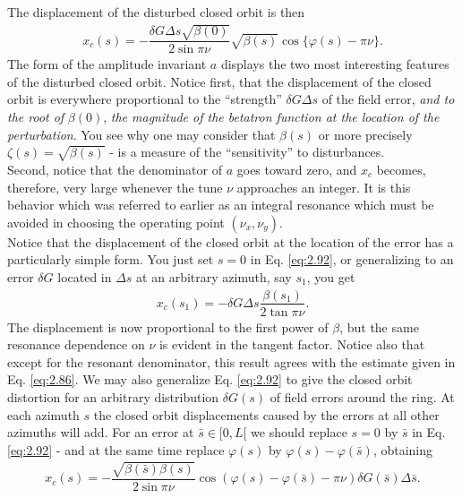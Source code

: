 The displacement of the disturbed closed orbit is then
\begin{align}\label{eq:2.92}
	x_c(s) = -\dfrac{\delta G \Delta s \sqrt{\beta(0)}}{2 \sin\pi\nu}\sqrt{\beta(s)}\cos\{\varphi(s)-\pi\nu\}.
\end{align}
The form of the amplitude invariant $a$ displays the two most interesting features of the disturbed closed orbit. Notice first, that the displacement of the closed orbit is everywhere
 proportional to the ``strength'' $\delta G \Delta s$ of the field error, \emph{and to the root of} $\beta(0)$, \emph{the magnitude of the betatron function at the location of the perturbation}. You see why one may consider that $\beta(s)$ or more precisely $\zeta(s) = \sqrt{\beta(s)}$ - is a measure of the ``sensitivity'' to disturbances.\\
Second, notice that the denominator of $a$ goes toward zero, and $x_c$ becomes, therefore, very large whenever the tune $\nu$ approaches an integer. It is this behavior which was referred
 to earlier as an integral resonance which must be avoided in choosing the operating point $(\nu_x, \nu_y)$.\\
Notice that the displacement of the closed orbit at the location of the error has a particularly
 simple form. You just set $s = 0$ in Eq. \eqref{eq:2.92}, or generalizing to an error $\delta G$ located in $\Delta s$ at an arbitrary azimuth, say $s_1$, you get
 \begin{align}
	x_c(s_1) = -\delta G \Delta s \dfrac{\beta{(s_1)}}{2 \tan\pi\nu}.
\end{align}
The displacement is now proportional to the first power of $\beta$, but the same resonance
dependence on $\nu$ is evident in the tangent factor. Notice also that except for the resonant denominator, this result agrees with the estimate given in Eq. \eqref{eq:2.86}.
We may also generalize Eq. \eqref{eq:2.92} to give the closed orbit distortion for an
arbitrary distribution $\delta G(s)$ of field errors around the ring. At each azimuth $s$ the closed orbit displacements caused by the errors at all other azimuths will add. For an error
 at $\bar{s} \in [0,L[$ we should replace $s = 0$ by $\bar{s}$ in Eq. \eqref{eq:2.92} - and at the same time replace $\varphi(s)$ by $\varphi(s) - \varphi(\bar{s})$, obtaining
\begin{align}\label{eq:dist_closed_orb}
x_c(s) = -\dfrac{\sqrt{\beta(\bar{s})\beta(s)}}{2\sin\pi\nu} \cos(\varphi(s)-\varphi(\bar{s})-\pi\nu)\delta G(\bar{s})\Delta\bar{s}.
\end{align}
